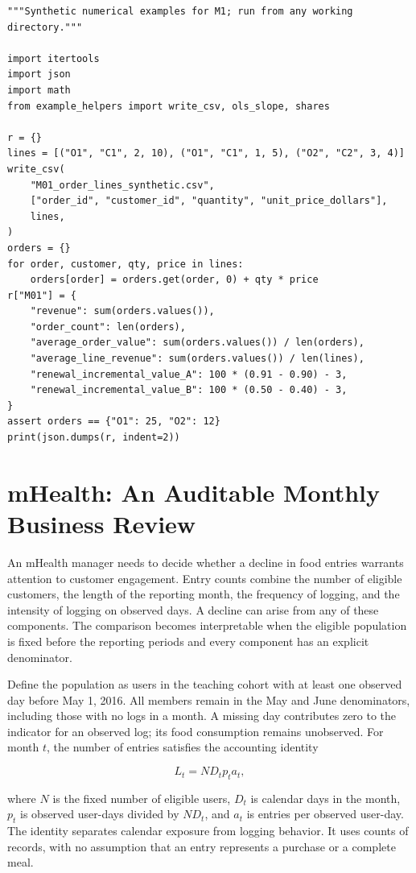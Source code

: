\begin{Verbatim}[breaklines,breakanywhere,fontsize=\small]
"""Synthetic numerical examples for M1; run from any working directory."""

import itertools
import json
import math
from example_helpers import write_csv, ols_slope, shares

r = {}
lines = [("O1", "C1", 2, 10), ("O1", "C1", 1, 5), ("O2", "C2", 3, 4)]
write_csv(
    "M01_order_lines_synthetic.csv",
    ["order_id", "customer_id", "quantity", "unit_price_dollars"],
    lines,
)
orders = {}
for order, customer, qty, price in lines:
    orders[order] = orders.get(order, 0) + qty * price
r["M01"] = {
    "revenue": sum(orders.values()),
    "order_count": len(orders),
    "average_order_value": sum(orders.values()) / len(orders),
    "average_line_revenue": sum(orders.values()) / len(lines),
    "renewal_incremental_value_A": 100 * (0.91 - 0.90) - 3,
    "renewal_incremental_value_B": 100 * (0.50 - 0.40) - 3,
}
assert orders == {"O1": 25, "O2": 12}
print(json.dumps(r, indent=2))
\end{Verbatim}

\hypertarget{M01-mhealth-an-auditable-monthly-business-review}{%
\section{mHealth: An Auditable Monthly Business
Review}\label{M01-mhealth-an-auditable-monthly-business-review}}

\noindent An mHealth manager needs to decide whether a decline in food entries
warrants attention to customer engagement. Entry counts combine the
number of eligible customers, the length of the reporting month, the
frequency of logging, and the intensity of logging on observed days. A
decline can arise from any of these components. The comparison becomes
interpretable when the eligible population is fixed before the reporting
periods and every component has an explicit denominator.

Define the population as users in the teaching cohort with at least one
observed day before May 1, 2016. All members remain in the May and June
denominators, including those with no logs in a month. A missing day
contributes zero to the indicator for an observed log; its food
consumption remains unobserved. For month \(t\), the number of entries
satisfies the accounting identity

\[
L_t=N D_t p_t a_t,
\]

where \(N\) is the fixed number of eligible users, \(D_t\) is calendar
days in the month, \(p_t\) is observed user-days divided by \(ND_t\),
and \(a_t\) is entries per observed user-day. The identity separates
calendar exposure from logging behavior. It uses counts of records, with
no assumption that an entry represents a purchase or a complete meal.

